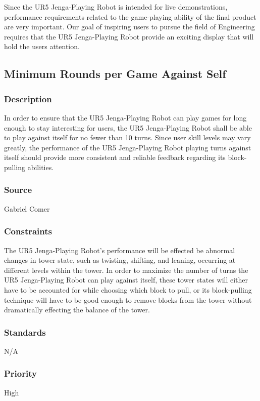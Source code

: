 Since the UR5 Jenga-Playing Robot is intended for live demonstrations, performance requirements related to the game-playing ability of the final product are very important. Our goal of inspiring users to pursue the field of Engineering requires that the UR5 Jenga-Playing Robot provide an exciting display that will hold the users attention.


\subsection{Minimum Rounds per Game Against Self}
\subsubsection{Description}
In order to ensure that the UR5 Jenga-Playing Robot can play games for long enough to stay interesting for users, the UR5 Jenga-Playing Robot shall be able to play against itself for no fewer than 10 turns. Since user skill levels may vary greatly, the performance of the UR5 Jenga-Playing Robot playing turns against itself should provide more consistent and reliable feedback regarding its block-pulling abilities.
\subsubsection{Source}
Gabriel Comer%
\subsubsection{Constraints}
The UR5 Jenga-Playing Robot's performance will be effected be abnormal changes in tower state, such as twisting, shifting, and leaning, occurring at different levels within the tower. In order to maximize the number of turns the UR5 Jenga-Playing Robot can play against itself, these tower states will either have to be accounted for while choosing which block to pull, or its block-pulling technique will have to be good enough to remove blocks from the tower without dramatically effecting the balance of the tower.
\subsubsection{Standards}
N/A
\subsubsection{Priority}
High

